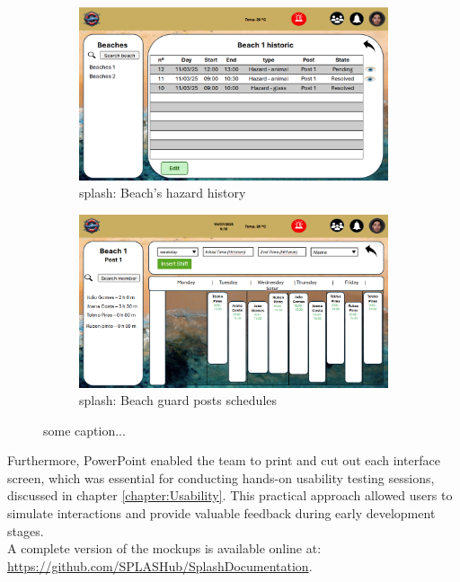 \begin{figure}[H]
    \centering
    \begin{subfigure}{0.48\textwidth}
    \centering
    \includegraphics[width=\linewidth]{figs/Mockups/ppt-mockups-beach-history.png}
    \caption{\ac{splash}: Beach's hazard history }
    \label{fig:ppt-mockups-hazard-history}
    \end{subfigure}
    \hfill
    \begin{subfigure}{0.48\textwidth}
    \centering
    \includegraphics[width=\linewidth]{figs/Mockups/ppt-mockups-schedule.png}
    \caption{\ac{splash}: Beach guard posts schedules }
    \label{fig:ppt-mockups-team-schedule}
    \end{subfigure}
    \caption{some caption...}
    \label{fig:ppt-map-team-management}
\end{figure}

Furthermore, PowerPoint enabled the team to print and cut out each interface screen, which was essential for conducting hands-on usability testing sessions, discussed in chapter \ref{chapter:Usability}. This practical approach allowed users to simulate interactions and provide valuable feedback during early development stages.\\
A complete version of the mockups is available online at: \url{https://github.com/SPLASHub/SplashDocumentation}. \\

